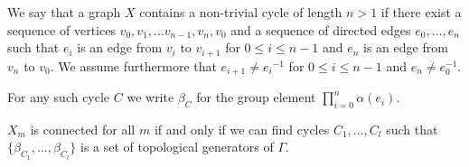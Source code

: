 \begin{defi}
	We say that a graph $X$ contains a non-trivial cycle of length $n>1$ if there exist a sequence of vertices $v_0,v_1,\dots v_{n-1},v_n,v_0$ and a sequence of directed edges $e_0,\ldots, e_{n}$ such that $e_i$ is an edge from $v_i$ to $v_{i+1}$ for $0\le i\le n-1$ and $e_n$ is an edge from $v_n$ to $v_0$. We assume furthermore that $e_{i+1}\neq {e_i}^{-1} $ for ${0\le i\le n-1}$ and $e_n\neq e_0^{-1}$.
	
	For any such cycle $C$ we write $\beta_C$ for the group element $\prod_{i=0}^n\alpha(e_i)$.
\end{defi}
\begin{lemma} \label{lemma:connected} 
	$X_m$ is connected for all $m$ if and only if we can find cycles $C_1,\dots , C_l$ such that $\{\beta_{C_1},\dots,\beta_{C_l} \}$ is a set of topological generators of $\Gamma$. 
\end{lemma}
